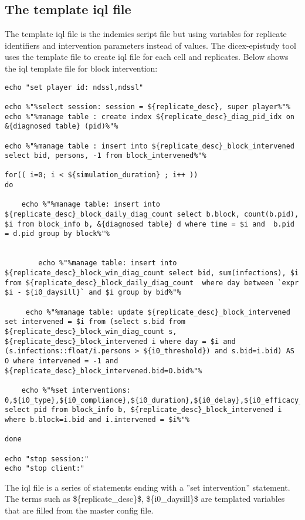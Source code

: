 \documentclass[11]{report}
\begin{document}
\subsection{The template iql file}
The template iql file is the indemics script file but using variables for replicate identifiers
and intervention parameters instead of values. The dicex-epistudy tool uses the template
file to create iql file for each cell and replicates. Below shows the iql template file
for block intervention:
\begin{lstlisting}[style=IQL]
echo "set player id: ndssl,ndssl"

echo %"%select session: session = ${replicate_desc}, super player%"%
echo %"%manage table : create index ${replicate_desc}_diag_pid_idx on &{diagnosed table} (pid)%"%

echo %"%manage table : insert into ${replicate_desc}_block_intervened select bid, persons, -1 from block_intervened%"%

for(( i=0; i < ${simulation_duration} ; i++ ))
do

	echo %"%manage table: insert into ${replicate_desc}_block_daily_diag_count select b.block, count(b.pid), $i from block_info b, &{diagnosed table} d where time = $i and  b.pid = d.pid group by block%"%


        echo %"%manage table: insert into ${replicate_desc}_block_win_diag_count select bid, sum(infections), $i from ${replicate_desc}_block_daily_diag_count  where day between `expr $i - ${i0_daysill}` and $i group by bid%"%

	 echo %"%manage table: update ${replicate_desc}_block_intervened set intervened = $i from (select s.bid from ${replicate_desc}_block_win_diag_count s, ${replicate_desc}_block_intervened i where day = $i and (s.infections::float/i.persons > ${i0_threshold}) and s.bid=i.bid) AS O where intervened = -1 and ${replicate_desc}_block_intervened.bid=O.bid%"%

	echo %"%set interventions:  0,${i0_type},${i0_compliance},${i0_duration},${i0_delay},${i0_efficacy_in},${i0_efficacy_out}, select pid from block_info b, ${replicate_desc}_block_intervened i where b.block=i.bid and i.intervened = $i%"%

done

echo "stop session:"
echo "stop client:"

\end{lstlisting}
The iql file is a series of statements ending with a ''set intervention'' statement. 
The terms such as \$\{replicate\_desc\}\$, \$\{i0\_daysill\}\$ are templated variables
that are filled from the master config file.
\end{document}
